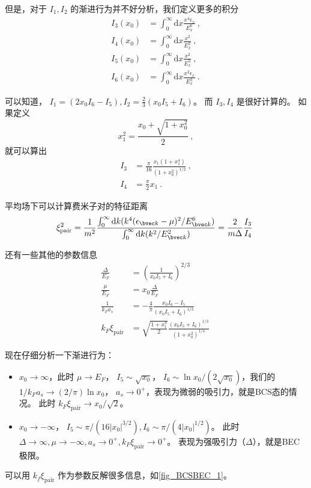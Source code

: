 但是，对于 $I_1, I_2$ 的渐进行为并不好分析，我们定义更多的积分
\begin{equation}
\begin{aligned}
I_3(x_0) &=\int_0^\infty\text{d}x\frac{x^4\epsilon_x}{E_x^6}~,\\
I_4(x_0) &=\int_0^\infty\text{d}x\frac{x^2}{E_x^2}~,\\
I_5(x_0) &=\int_0^\infty\text{d}x\frac{x^2}{E_x^3}~,\\
I_6(x_0) &=\int_0^\infty\text{d}x\frac{x^2\epsilon_x}{E_x^3}~.
\end{aligned}
\end{equation}

可以知道， $I_1=(2x_0I_6-I_5),I_2 = \frac{2}{3}(x_0I_5+I_6)$。 而 $I_3,I_4$ 是很好计算的。 如果定义
\begin{equation}
x_1^2=\frac{x_0+\sqrt{1+x_0^2}}{2}~,
\end{equation}
就可以算出
\begin{equation}
\begin{aligned}
I_3&=\frac{\pi}{16}\frac{x_1(1+x_1^4)}{(1+x_0^2)^{1/2}}~,\\
I_4&=\frac{\pi}{2}x_1~.
\end{aligned}
\end{equation}

平均场下可以计算费米子对的特征距离
\begin{equation}
\xi_{\text{pair}}^2 = \frac{1}{m^2}\frac{\int_0^\infty\text{d}k(k^4(\epsilon_{\bvec k}-\mu)^2/E_{\bvec k}^6)}{\int_0^\infty\text{d}k(k^2/E_{\bvec k}^2)} = \frac{2}{m\Delta}\frac{I_3}{I_4}~
\end{equation}

还有一些其他的参数信息
\begin{equation}
\begin{aligned}
\frac{\Delta}{E_F} &= \left(\frac{1}{x_0I_5+I_6}\right)^{2/3}\\
\frac{\mu}{E_F} &= x_0\frac{\Delta}{E_F} \\
\frac{1}{k_Fa_s} &= -\frac{4}{\pi}\frac{x_0I_6-I_5}{(x_0I_5+I_6)^{1/3}}\\
k_F\xi_{\text{pair}} &= \sqrt{\frac{1+x_1^4}{2}}\frac{(x_0I_5+I_6)^{1/3}}{(1+x_0^2)^{1/4}}
\end{aligned}
~
\end{equation}

现在仔细分析一下渐进行为：

\begin{itemize}
\item $x_0\to\infty$，此时 $\mu\to E_F$， $I_5\sim\sqrt{x_0}$， $I_6\sim\ln x_0/(2\sqrt{x_0})$，我们的 $1/k_Fa_s\to(2/\pi)\ln x_0$， $a_s\to0^+$，表现为微弱的吸引力，就是BCS态的情况。 此时 $k_F\xi_{\text{pair}}\to x_0/\sqrt2$。
\item $x_0\to-\infty$， $I_5\sim\pi/(16|x_0|^{3/2}), I_6\sim\pi/(4|x_0|^{1/2})$。 此时 $\Delta\to\infty, \mu\to-\infty, a_s\to0^+,k_F\xi_{\text{pair}}\to0^+$。 表现为强吸引力（$\Delta$），就是BEC极限。
\end{itemize}

可以用 $k_f\xi_{\text{pair}}$ 作为参数反解很多信息，如\autoref{fig_BCSBEC_1}。


